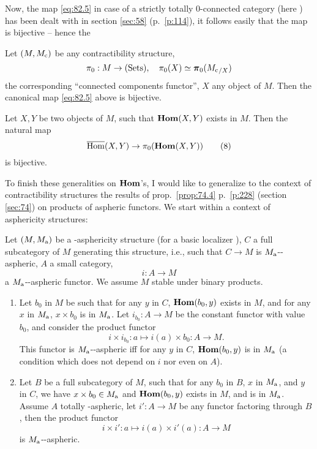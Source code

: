Now, the map \eqref{eq:82.5} in case of a strictly totally
$0$-connected category (here \Chat) has been dealt with in section
\ref{sec:58} (p.\ \ref{p:114}), it follows easily that the map is
bijective -- hence the
\begin{propositionnum}\label{prop:82.1}
  Let $(M,M_{\mathrm{c}})$ be any contractibility structure,
  \[{\pi_0}:M\to{\ensuremath{(\mathrm{Sets})}},\quad
  {\ensuremath{\pi_0}}(X)\simeq{\ensuremath{\boldsymbol\pi_0}}({M_{\mathrm{c}}}_{/X})\]
  the corresponding ``connected components functor'', $X$ any object
  of $M$. Then the canonical map \eqref{eq:82.5} above is bijective.
\end{propositionnum}
\begin{corollary}
  Let $X,Y$ be two objects of $M$, such that $\operatorname{\mathbf{Hom}}(X,Y)$ exists in
  $M$. Then the natural map
  \begin{equation}
    \label{eq:82.8}
    \operatorname{\overline{Hom}}(X,Y) \to {\ensuremath{\pi_0}}(\operatorname{\mathbf{Hom}}(X,Y))\tag{8}
  \end{equation}
  is bijective.
\end{corollary}

\bigbreak

To finish these generalities on $\operatorname{\mathbf{Hom}}$'s, I would like to generalize
to the context of contractibility structures the results of prop.\
\ref{prop:74.4} p.\ \ref{p:228} (section \ref{sec:74}) on products of
aspheric functors. We start within a context of asphericity
structures:
\begin{propositionnum}\label{prop:82.2}
  Let $(M,M_{\mathrm{a}})$ be a \scrW-asphericity structure \textup(for a basic
  localizer \scrW\textup), $C$ a full subcategory of $M$ generating
  this structure, i.e., such that $C\to M$ is $M_{\mathrm{a}}$-\scrW-aspheric,
  $A$ a small category,
  \[ i : A\to M\]
  a $M_{\mathrm{a}}$-\scrW-aspheric functor. We assume $M$ stable under binary
  products.
  \begin{enumerate}[label=\alph*),font=\normalfont]
  \item\label{it:82.prop2.a}
    Let $b_0$ in $M$ be such that for any $y$ in $C$, $\operatorname{\mathbf{Hom}}(b_0,y)$
    exists in $M$, and for any $x$ in $M_{\mathrm{a}}$, $x\times b_0$ is in
    $M_{\mathrm{a}}$. Let $i_{b_0}:A\to M$ be the constant functor with value
    $b_0$, and consider the product functor
    \[ i \times i_{b_0}: a\mapsto i(a)\times b_0 : A\to M.\]
    This functor is $M_{\mathrm{a}}$-\scrW-aspheric if{f} for any $y$ in $C$,
    $\operatorname{\mathbf{Hom}}(b_0,y)$ is in $M_{\mathrm{a}}$ \textup(a condition which does not
    depend on $i$ nor even on $A$\textup).
  \item\label{it:82.prop2.b}
    Let $B$ be a full subcategory of $M$, such that for any $b_0$ in
    $B$, $x$ in $M_{\mathrm{a}}$, and $y$ in $C$, we have $x\times b_0\in
    M_{\mathrm{a}}$ and $\operatorname{\mathbf{Hom}}(b_0,y)$ exists in $M$, and is in
    $M_{\mathrm{a}}$. Assume $A$ totally \scrW-aspheric, let $i':A\to M$ be
    any functor factoring through $B$, then the product functor
    \[ i \times i' : a\mapsto i(a)\times i'(a) : A\to M\]
    is $M_{\mathrm{a}}$-\scrW-aspheric.
  \end{enumerate}
\end{propositionnum}

